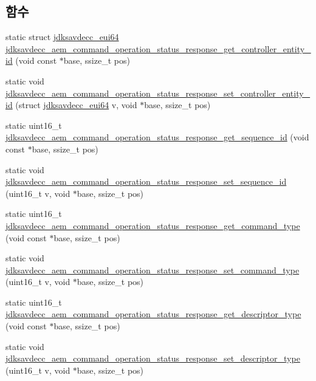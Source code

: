 \subsection*{함수}
\begin{DoxyCompactItemize}
\item 
static struct \hyperlink{structjdksavdecc__eui64}{jdksavdecc\+\_\+eui64} \hyperlink{group__command__operation__status__response_ga51b9b62a42fcbc86813666a29214913b}{jdksavdecc\+\_\+aem\+\_\+command\+\_\+operation\+\_\+status\+\_\+response\+\_\+get\+\_\+controller\+\_\+entity\+\_\+id} (void const $\ast$base, ssize\+\_\+t pos)
\item 
static void \hyperlink{group__command__operation__status__response_ga69c325d2ba8dfb6961459456fd130b14}{jdksavdecc\+\_\+aem\+\_\+command\+\_\+operation\+\_\+status\+\_\+response\+\_\+set\+\_\+controller\+\_\+entity\+\_\+id} (struct \hyperlink{structjdksavdecc__eui64}{jdksavdecc\+\_\+eui64} v, void $\ast$base, ssize\+\_\+t pos)
\item 
static uint16\+\_\+t \hyperlink{group__command__operation__status__response_ga8f00549c1465858adacb58948da1d4cb}{jdksavdecc\+\_\+aem\+\_\+command\+\_\+operation\+\_\+status\+\_\+response\+\_\+get\+\_\+sequence\+\_\+id} (void const $\ast$base, ssize\+\_\+t pos)
\item 
static void \hyperlink{group__command__operation__status__response_ga2c96d1e460feb808ee2ecbc1185d0a04}{jdksavdecc\+\_\+aem\+\_\+command\+\_\+operation\+\_\+status\+\_\+response\+\_\+set\+\_\+sequence\+\_\+id} (uint16\+\_\+t v, void $\ast$base, ssize\+\_\+t pos)
\item 
static uint16\+\_\+t \hyperlink{group__command__operation__status__response_gad745986817c89f59c54154d9d7d78ed8}{jdksavdecc\+\_\+aem\+\_\+command\+\_\+operation\+\_\+status\+\_\+response\+\_\+get\+\_\+command\+\_\+type} (void const $\ast$base, ssize\+\_\+t pos)
\item 
static void \hyperlink{group__command__operation__status__response_gaf711da12945a7ac49822d4fcad8100e0}{jdksavdecc\+\_\+aem\+\_\+command\+\_\+operation\+\_\+status\+\_\+response\+\_\+set\+\_\+command\+\_\+type} (uint16\+\_\+t v, void $\ast$base, ssize\+\_\+t pos)
\item 
static uint16\+\_\+t \hyperlink{group__command__operation__status__response_gac62d4d0e0ed3f8d02ab1dabfdd3d50fe}{jdksavdecc\+\_\+aem\+\_\+command\+\_\+operation\+\_\+status\+\_\+response\+\_\+get\+\_\+descriptor\+\_\+type} (void const $\ast$base, ssize\+\_\+t pos)
\item 
static void \hyperlink{group__command__operation__status__response_ga457b794ff2bd28e533af8ba485b3397a}{jdksavdecc\+\_\+aem\+\_\+command\+\_\+operation\+\_\+status\+\_\+response\+\_\+set\+\_\+descriptor\+\_\+type} (uint16\+\_\+t v, void $\ast$base, ssize\+\_\+t pos)

\end{DoxyCompactItemize}
